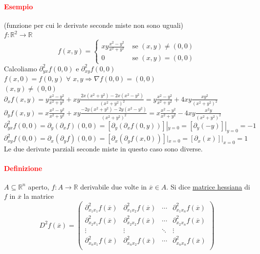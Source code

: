 \documentclass{article}
\newcommand{\R}{\mathbb{R}}
\begin{document}
\paragraph{\textcolor{red}{Esempio}}
(funzione per cui le derivate seconde miste non sono uguali)\\
$f:\R^2\rightarrow\R$\\
\begin{equation*}
    f(x,y)=\begin{cases}
        xy\frac{x^2-y^2}{x^2+y^2}&\text{  se  }(x,y)\neq (0,0)\\
        0&\text{  se  }(x,y)=(0,0)
    \end{cases}
\end{equation*}
Calcoliamo $\partial_{yx}^2f(0,0)$ e $\partial_{xy}^2f(0,0)$\\
$f(x,0)=f(0,y)\,\, \forall\,\, x,y \Rightarrow \nabla f(0,0)=(0,0)$\\
$(x,y)\neq (0,0)$\\
$\partial_x f(x,y)=y \frac{x^2-y^2}{x^2+y^2}+xy\frac{2x(x^2+y^2)-2x(x^2-y^2)}{(x^2+y^2)^2}= y \frac{x^2-y^2}{x^2+y^2}+4xy\frac{xy^2}{(x^2+y^2)^2}$\\
$\partial_yf(x,y)=x\frac{x^2-y^2}{x^2+y^2}+xy\frac{-2y(x^2+y^2)-2y(x^2-y^2)}{(x^2+y^2)^2}=x\frac{x^2-y^2}{x^2+y^2}-4xy\frac{x^2y}{(x^2+y^2)^2}$\\
$\partial_{yx}^2f(0,0)=\partial_y (\partial_x f)(0,0)=[\partial_y(\partial_xf(0,y))]|_{y=0}=[\partial_y(-y)]|_{y=0}=-1$\\
$\partial_{xy}^2f(0,0)=\partial_x(\partial_yf)(0,0)= [\partial_x(\partial_yf(x,0))]|_{x=0}=[\partial_x(x)]|_{x=0}=1$\\
Le due derivate parziali seconde miste in questo caso sono diverse.

\paragraph{\textcolor{red}{Definizione}}
$A \subseteq \R^n$ aperto, $f: A \rightarrow \R$ derivabile due volte in $\overline{x}\in A$. Si dice \underline{matrice hessiana} di $f$ in $\overline{x}$ la matrice
\begin{equation*}
    D^2f(\overline{x})=\begin{pmatrix}
        \partial_{x_1x_1}^2f(\overline{x})& \partial_{x_1x_2}^2f(\overline{x})  & \cdots & \partial_{x_1x_n}^2f(\overline{x})\\
        \partial_{x_2x_1}^2f(\overline{x})& \partial_{x_2x_2}^2f(\overline{x}) & \cdots & \partial_{x_2x_n}^2f(\overline{x})\\
        \vdots&\vdots & \ddots &\vdots \\
        \partial_{x_nx_1}^2f(\overline{x})& \partial_{x_nx_2}^2f(\overline{x})& \cdots & \partial_{x_nx_n}^2f(\overline{x}) \\
    \end{pmatrix}
\end{equation*}
\end{document}
